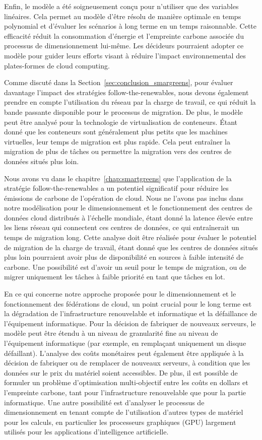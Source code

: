Enfin, le modèle a été soigneusement conçu pour n'utiliser que des variables linéaires. Cela permet au modèle d'être résolu de manière optimale en temps polynomial et d'évaluer les scénarios à long terme en un temps raisonnable. Cette efficacité réduit la consommation d'énergie et l'empreinte carbone associée du processus de dimensionnement lui-même. Les décideurs pourraient adopter ce modèle pour guider leurs efforts visant à réduire l'impact environnemental des plates-formes de cloud computing.


Comme discuté dans la Section~\ref{sec:conclusion_smargreens}, pour évaluer davantage l'impact des stratégies follow-the-renewables, nous devons également prendre en compte l'utilisation du réseau par la charge de travail, ce qui réduit la bande passante disponible pour le processus de migration. De plus, le modèle peut être analysé pour la technologie de virtualisation de conteneurs. Étant donné que les conteneurs sont généralement plus petits que les machines virtuelles, leur temps de migration est plus rapide. Cela peut entraîner la migration de plus de tâches ou permettre la migration vers des centres de données situés plus loin.


Nous avons vu dans le chapitre~\ref{chap:smartgreens} que l'application de la stratégie follow-the-renewables a un potentiel significatif pour réduire les émissions de carbone de l'opération de cloud. Nous ne l'avons pas inclus dans notre modélisation pour le dimensionnement et le fonctionnement des centres de données cloud distribués à l'échelle mondiale, étant donné la latence élevée entre les liens réseau qui connectent ces centres de données, ce qui entraînerait un temps de migration long. Cette analyse doit être réalisée pour évaluer le potentiel de migration de la charge de travail, étant donné que les centres de données situés plus loin pourraient avoir plus de disponibilité en sources à faible intensité de carbone. Une possibilité est d'avoir un seuil pour le temps de migration, ou de migrer uniquement les tâches à faible priorité en tant que tâches en lot.



En ce qui concerne notre approche proposée pour le dimensionnement et le fonctionnement des fédérations de cloud, un point crucial pour le long terme est la dégradation de l'infrastructure renouvelable et informatique et la défaillance de l'équipement informatique. Pour la décision de fabriquer de nouveaux serveurs, le modèle peut être étendu à un niveau de granularité fine au niveau de l'équipement informatique (par exemple, en remplaçant uniquement un disque défaillant). L'analyse des coûts monétaires peut également être appliquée à la décision de fabriquer ou de remplacer de nouveaux serveurs, à condition que les données sur le prix du matériel soient accessibles. De plus, il est possible de formuler un problème d'optimisation multi-objectif entre les coûts en dollars et l'empreinte carbone, tant pour l'infrastructure renouvelable que pour la partie informatique. Une autre possibilité est d'analyser le processus de dimensionnement en tenant compte de l'utilisation d'autres types de matériel pour les calculs, en particulier les processeurs graphiques (GPU) largement utilisés pour les applications d'intelligence artificielle.


